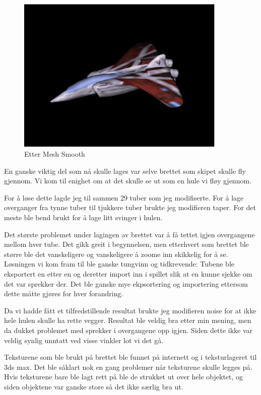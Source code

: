 \documentclass[11pt, dvips]{report}
\begin{document}
\begin{figure}[hbtp!]
\center\includegraphics[width=10cm]{image003.eps}
\caption{Etter Mesh Smooth}
\end{figure}

En ganske viktig del som nå skulle lages var selve brettet som skipet
skulle fly gjennom. Vi kom til enighet om at det skulle se ut som en
hule vi fløy gjennom.

For å løse dette lagde jeg til sammen 29 tuber som jeg modifiserte.
For å lage overganger fra tynne tuber til tjukkere tuber brukte jeg
modifieren taper. For det meste ble bend brukt for å lage litt svinger
i hulen.

Det største problemet under lagingen av brettet var å få tettet igjen
overgangene mellom hver tube. Det gikk greit i begynnelsen, men
etterhvert som brettet ble større ble det vanskeligere og vanskeligere
å zoome inn skikkelig for å se. Løsningen vi kom fram til ble ganske
tungvinn og tidkrevende: Tubene ble eksportert en etter en og deretter
import inn i spillet slik at en kunne sjekke om det var sprekker der.
Det ble ganske mye ekpsortering og importering ettersom dette måtte
gjøres for hver forandring.

Da vi hadde fått et tilfredstillende resultat brukte jeg modifieren
noise for at ikke hele hulen skulle ha rette vegger. Resultat ble
veldig bra etter min mening, men da dukket problemet med sprekker i
overgangene opp igjen. Siden dette ikke var veldig synlig unntatt ved
visse vinkler lot vi det gå.

Teksturene som ble brukt på brettet ble funnet på internett og i
teksturlageret til 3ds max. Det ble såklart nok en gang problemer når
teksturene skulle legges på. Hvis teksturene bare ble lagt rett på ble
de strukket ut over hele objektet, og siden objektene var ganske store
så det ikke særlig bra ut.
\end{document}
